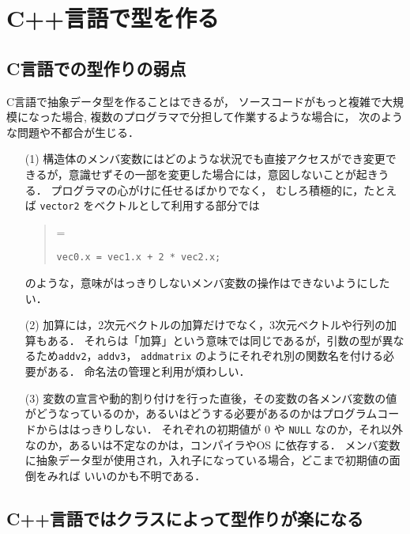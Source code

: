 \documentclass[11pt,a4,epsf]{jarticle}
\def\linesparpage#1{\baselineskip=\textheight\divide\baselineskip#1}
\begin{document}
\newpage
\section{C++言語で型を作る}

\subsection{C言語での型作りの弱点}

C言語で抽象データ型を作ることはできるが，
ソースコードがもっと複雑で大規模になった場合,
複数のプログラマで分担して作業するような場合に，
次のような問題や不都合が生じる．

\begin{enumerate}
 \item[(1)] 
構造体のメンバ変数にはどのような状況でも直接アクセスができ変更できるが，意識せずその一部を変更した場合には，意図しないことが起きうる．
プログラマの心がけに任せるばかりでなく，
むしろ積極的に，たとえば \verb+vector2+ をベクトルとして利用する部分では
\begin{quote}
\linesparpage{50}
\begin{verbatim}
vec0.x = vec1.x + 2 * vec2.x;
\end{verbatim}
\end{quote}
のような，意味がはっきりしないメンバ変数の操作はできないようにしたい．
 \item[(2)] 
加算には，2次元ベクトルの加算だけでなく，3次元ベクトルや行列の加算もある．
それらは「加算」という意味では同じであるが，引数の型が異なるため\verb+addv2+，\verb+addv3+，
\verb+addmatrix+ のようにそれぞれ別の関数名を付ける必要がある．
命名法の管理と利用が煩わしい．
\item[(3)] 
変数の宣言や動的割り付けを行った直後，その変数の各メンバ変数の値がどうなっているのか，あるいはどうする必要があるのかはプログラムコードからははっきりしない．
それぞれの初期値が 0 や \verb+NULL+ なのか，それ以外なのか，あるいは不定なのかは，コンパイラやOS に依存する．
メンバ変数に抽象データ型が使用され，入れ子になっている場合，どこまで初期値の面倒をみれば
いいのかも不明である．
\end{enumerate}


\subsection{C++言語ではクラスによって型作りが楽になる}
\end{document}
